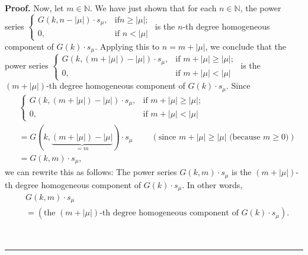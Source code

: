 \documentclass[numbers=enddot,12pt,final,onecolumn,notitlepage]{scrartcl}%
\theoremstyle{definition}
\newenvironment{proof}[1][Proof]{\noindent\textbf{#1.} }{\ \rule{0.5em}{0.5em}}
\newenvironment{verlong}{}{}
\begin{document}
\begin{verlong}
\begin{proof}
Now, let $m\in\mathbb{N}$. We have just shown that for each $n\in\mathbb{N}$,
the power series $%
\begin{cases}
G\left(  k,n-\left\vert \mu\right\vert \right)  \cdot s_{\mu}, & \text{if
}n\geq\left\vert \mu\right\vert ;\\
0, & \text{if }n<\left\vert \mu\right\vert
\end{cases}
$ is the $n$-th degree homogeneous component of $G\left(  k\right)  \cdot
s_{\mu}$. Applying this to $n=m+\left\vert \mu\right\vert $, we conclude that
the power series $%
\begin{cases}
G\left(  k,\left(  m+\left\vert \mu\right\vert \right)  -\left\vert
\mu\right\vert \right)  \cdot s_{\mu}, & \text{if }m+\left\vert \mu\right\vert
\geq\left\vert \mu\right\vert ;\\
0, & \text{if }m+\left\vert \mu\right\vert <\left\vert \mu\right\vert
\end{cases}
$ is the $\left(  m+\left\vert \mu\right\vert \right)  $-th degree homogeneous
component of $G\left(  k\right)  \cdot s_{\mu}$. Since%
\begin{align*}
&
\begin{cases}
G\left(  k,\left(  m+\left\vert \mu\right\vert \right)  -\left\vert
\mu\right\vert \right)  \cdot s_{\mu}, & \text{if }m+\left\vert \mu\right\vert
\geq\left\vert \mu\right\vert ;\\
0, & \text{if }m+\left\vert \mu\right\vert <\left\vert \mu\right\vert
\end{cases}
\\
&  =G\left(  k,\underbrace{\left(  m+\left\vert \mu\right\vert \right)
-\left\vert \mu\right\vert }_{=m}\right)  \cdot s_{\mu}%
\ \ \ \ \ \ \ \ \ \ \left(  \text{since }m+\left\vert \mu\right\vert
\geq\left\vert \mu\right\vert \text{ (because }m\geq0\text{)}\right) \\
&  =G\left(  k,m\right)  \cdot s_{\mu},
\end{align*}
we can rewrite this as follows: The power series $G\left(  k,m\right)  \cdot
s_{\mu}$ is the $\left(  m+\left\vert \mu\right\vert \right)  $-th degree
homogeneous component of $G\left(  k\right)  \cdot s_{\mu}$. In other words,%
\begin{align}
&  G\left(  k,m\right)  \cdot s_{\mu}\nonumber\\
&  =\left(  \text{the }\left(  m+\left\vert \mu\right\vert \right)  \text{-th
degree homogeneous component of }G\left(  k\right)  \cdot s_{\mu}\right)  .
\label{pf.cor.Gkm.pieri.left}%
\end{align}



\end{proof}
\end{verlong}
\end{document}
